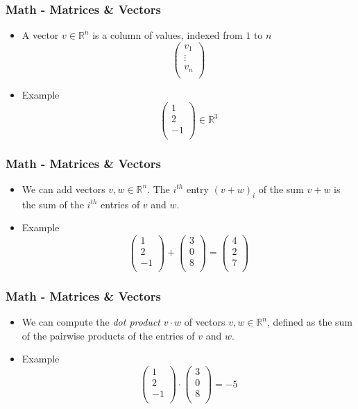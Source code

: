 \documentclass{beamer}
\newcommand{\R}{\mathbb{R}}
\begin{document}
\frame
{
\frametitle{Math - Matrices \& Vectors}
\begin{itemize}[<+->]
\item A vector $v \in \R^n$ is a column of values, indexed from $1$ to $n$
\[ 
\begin{pmatrix}
v_1  \\
\vdots  \\
v_n  \\
\end{pmatrix}
\]
\item Example 
\[ 
\begin{pmatrix}
1\\
2\\
-1\\
\end{pmatrix}
\in \R^3
\]
\end{itemize}
}

\frame
{
\frametitle{Math - Matrices \& Vectors}
\begin{itemize}[<+->]
\item We can add vectors $v,w \in \R^n$. The $i^{th}$ entry $(v+w)_i$ of the sum $v+w$ is the sum of the $i^{th}$ entries of $v$ and $w$.
\item Example 
\[ 
\begin{pmatrix}
1\\
2\\
-1\\
\end{pmatrix}
+
\begin{pmatrix}
3\\
0\\
8\\
\end{pmatrix}
=
\begin{pmatrix}
4\\
2\\
7\\
\end{pmatrix}
\]
\end{itemize}
}

\frame
{
\frametitle{Math - Matrices \& Vectors}
\begin{itemize}[<+->]
\item We can compute the \emph{dot product} $v \cdot w$ of vectors $v,w \in \R^n$, defined as the sum of the pairwise products of the entries of $v$ and $w$. 
\item Example 
\[ 
\begin{pmatrix}
1\\
2\\
-1\\
\end{pmatrix}
\cdot
\begin{pmatrix}
3\\
0\\
8\\
\end{pmatrix}
=
-5
\]
\end{itemize}
}
\end{document}
